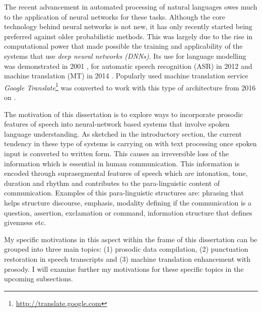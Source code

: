 The recent advancement in automated processing of natural languages owes much to the application of neural networks for these tasks. Although the core technology behind neural networks is not new, it has only recently started being preferred against older probabilistic methods. This was largely due to the rise in computational power that made possible the training and applicability of the systems that use \textit{deep neural networks (DNNs)}. Its use for language modelling was demonstrated in 2001 \citep{Bengio:LM}, for automatic speech recognition (ASR) in 2012 \citep{asr_dnnhmm} and machine translation (MT) in 2014 \citep{sutskever}. Popularly used machine translation service \textit{Google Translate}\footnote{\url{http://translate.google.com}} was converted to work with this type of architecture from 2016 on \citep{google_nmt}. 

The motivation of this dissertation is to explore ways to incorporate prosodic features of speech into neural-network based systems that involve spoken language understanding. As sketched in the introductory section, the current tendency in these type of systems is carrying on with text processing once spoken input is converted to written form. This causes an irreversible loss of the information which is essential in human communication. This information is encoded through suprasegmental features of speech which are intonation, tone, duration and rhythm and contributes to the para-linguistic content of communication. Examples of this para-linguistic structures are: phrasing that helps structure discourse, emphasis, modality defining if the communication is a question, assertion, exclamation or command, information structure that defines givenness etc. 

My specific motivations in this aspect within the frame of this dissertation can be grouped into three main topics: (1) prosodic data compilation, (2) punctuation restoration in speech transcripts and (3) machine translation enhancement with prosody. I will examine further my motivations for these specific topics in the upcoming subsections. 

